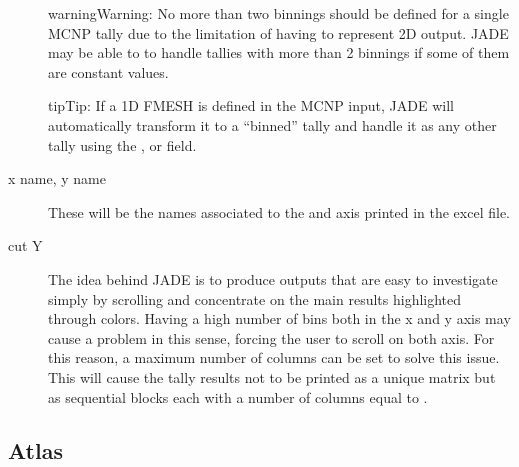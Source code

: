 \documentclass[letterpaper,10pt,english]{sphinxmanual}
\let\sphinxpxdimen\pdfpxdimen\else\newdimen\sphinxpxdimen
\begin{document}
\begin{description}
\begin{sphinxadmonition}{warning}{Warning:}
No more than two binnings should be defined for a single MCNP tally due to the limitation of having to represent
2\sphinxhyphen{}D output. JADE may be able to to handle tallies with more than 2 binnings if some of them are constant
values.
\end{sphinxadmonition}

\begin{sphinxadmonition}{tip}{Tip:}
If a 1D FMESH is defined in the MCNP input, JADE will automatically transform it to a “binned” tally and handle it
as any other tally using the ,  or  field.
\end{sphinxadmonition}

\item[{x name, y name}] \leavevmode
These will be the names associated to the  and  axis printed in the excel file.

\item[{cut Y}] \leavevmode
The idea behind JADE is to produce outputs that are easy to investigate simply by scrolling and concentrate on the
main results highlighted through colors. Having a high number of bins both in the x and y axis may cause a problem
in this sense, forcing the user to scroll on both axis. For this reason, a maximum number of columns can be set to
solve this issue. This will cause the tally results not to be printed as a unique matrix but as sequential blocks
each with a number of columns equal to .

\end{description}


\subsection{Atlas}
\label{\detokenize{usage/configuration:atlas}}
\noindent\sphinxincludegraphics[width=600\sphinxpxdimen]{{atlasbench}.png}
\end{document}

